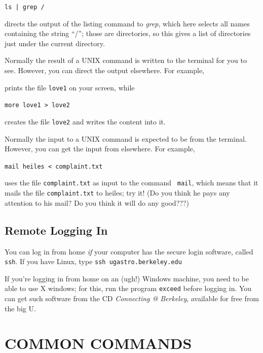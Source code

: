 \documentclass[psfig,preprint]{aastex}
\begin{document}
\noindent \verb$ls | grep /$

\noindent directs the output of the listing command to {\it grep}, which
here selects all names containing the string ``/''; those are
directories, so this gives a list of directories just under the current
directory. 

	Normally the result of a UNIX command is written to the terminal
for you to see. However, you can direct the output elsewhere. For
example, 


\noindent prints the file {\tt love1} on your screen, while

\noindent \verb$more love1 > love2$
 
\noindent creates the file {\tt love2} and writes the content into it.

	Normally the input to a UNIX command is expected to be from the
terminal. However, you can get the input from elsewhere. For example, 

\noindent \verb$mail heiles < complaint.txt$

\noindent uses the file {\tt complaint.txt} as input to the command {\tt
  mail}, which means that it mails the file {\tt complaint.txt} to
  heiles; try it! (Do you think he pays any attention to his mail? Do
  you think it will do any good???)

\subsection{Remote Logging In}\label{remote}

	You can log in from home {\it if} your computer has the secure
login software, called {\tt ssh}. 
If you have Linux, type {\tt ssh ugastro.berkeley.edu}

If you're logging in from home on an (ugh!) Windows machine, you need to
be able to use X windows; for this, run the program {\tt exceed} before
logging in. You can get such software from the CD {\it Connecting @
Berkeley}, available for free from the big U.


\eject

\section{COMMON COMMANDS}\label{commands}
\vspace{-0.2in}
\end{document}
